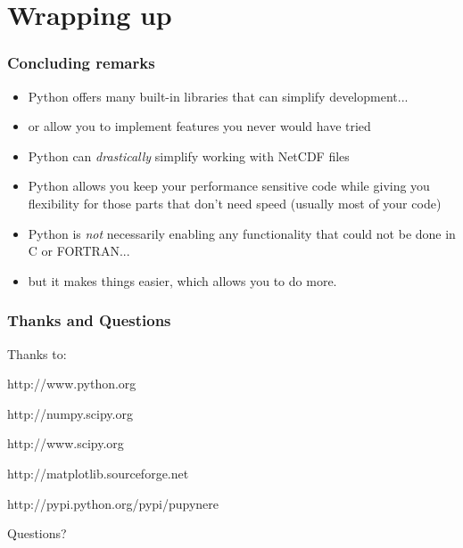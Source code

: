 \documentclass[red, hyperref={pdfpagelabels=false}]{beamer}
\begin{document}
\section{Wrapping up}
\begin{frame}[<+->]
  \frametitle{Concluding remarks}
  \begin{itemize}
    \item Python offers many built-in libraries that can simplify development...
    \item or allow you to implement features you never would have tried
    \item Python can \emph{drastically} simplify working with NetCDF files
    \item Python allows you keep your performance sensitive code while giving you
      flexibility for those parts that don't need speed (usually most of your code)
    \item Python is \emph{not} necessarily enabling any functionality that could not be done in C or FORTRAN...
    \item but it makes things easier, which allows you to do more.
  \end{itemize}
\end{frame}

\begin{frame}
  \frametitle{Thanks and Questions}
  Thanks to:
  \begin{description}[Matplotlib]
    \item[Python]{http://www.python.org}
    \item[NumPy]{http://numpy.scipy.org}
    \item[SciPy]{http://www.scipy.org}
    \item[Matplotlib]{http://matplotlib.sourceforge.net}
    \item[pupynere]{http://pypi.python.org/pypi/pupynere}
  \end{description}
  Questions?
\end{frame}
\end{document}
